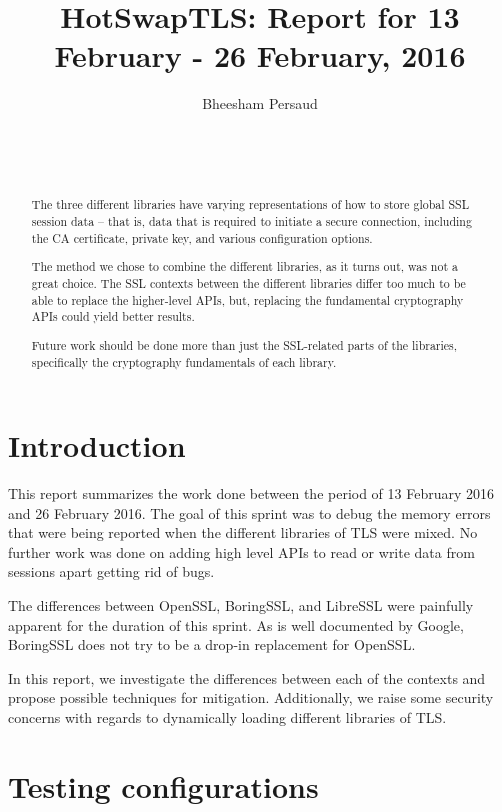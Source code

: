 \documentclass{acm_proc_article-sp}
\title{HotSwapTLS: Report for 13 February - 26 February, 2016}
\author{
    \alignauthor
    Bheesham Persaud\\
        \affaddr{Carleton University}\\
        \affaddr{1125 Colonel By Drive}\\
        \affaddr{Ottawa, Ontario}\\
        \email{bheeshampersaud@cmail.carleton.ca}
}
\begin{document}
\maketitle

\begin{abstract}\label{sec:abstract}

  The three different libraries have varying representations of how to store
  global SSL session data -- that is, data that is required to initiate a secure
  connection, including the CA certificate, private key, and various
  configuration options.

  The method we chose to combine the different libraries, as it turns out, was
  not a great choice. The SSL contexts between the different libraries differ
  too much to be able to replace the higher-level APIs, but, replacing the
  fundamental cryptography APIs could yield better results.

  Future work should be done more than just the SSL-related parts of the
  libraries, specifically the cryptography fundamentals of each library.

\end{abstract}

\section{Introduction}

This report summarizes the work done between the period of 13 February 2016 and
26 February 2016. The goal of this sprint was to debug the memory errors that
were being reported when the different libraries of TLS were mixed.  No further
work was done on adding high level APIs to read or write data from sessions
apart getting rid of bugs.

The differences between OpenSSL, BoringSSL, and LibreSSL were painfully apparent
for the duration of this sprint. As is well documented by Google, BoringSSL does
not try to be a drop-in replacement for OpenSSL.

In this report, we investigate the differences between each of the contexts and
propose possible techniques for mitigation. Additionally, we raise some security
concerns with regards to dynamically loading different libraries of TLS.

\section{Testing configurations}\label{Sec:Config}
\end{document}
